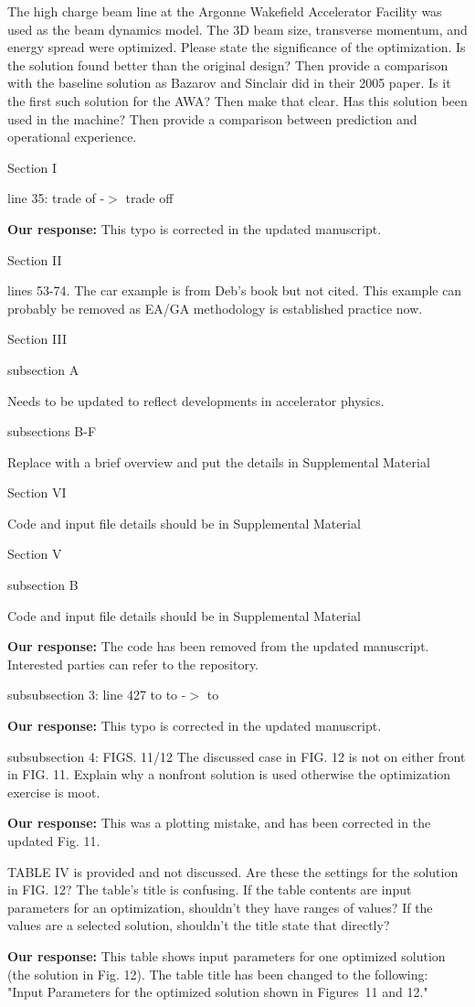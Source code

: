 \documentclass{article}
\begin{document}
The high charge beam line at the Argonne Wakefield Accelerator
Facility was used as the beam dynamics model. The 3D beam size,
transverse momentum, and energy spread were optimized. Please state
the significance of the optimization. Is the solution found better
than the original design? Then provide a comparison with the baseline
solution as Bazarov and Sinclair did in their 2005 paper. Is it the
first such solution for the AWA? Then make that clear. Has this
solution been used in the machine? Then provide a comparison between
prediction and operational experience.

Section I

line 35: trade of -$>$ trade off

{\bf Our response:} {\color{blue} This typo is corrected in the updated manuscript.}

Section II

lines 53-74. The car example is from Deb’s book but not cited. This
example can probably be removed as EA/GA methodology is established
practice now.

Section III

subsection A

Needs to be updated to reflect developments in accelerator physics.

subsections B-F

Replace with a brief overview and put the details in Supplemental
Material

Section VI

Code and input file details should be in Supplemental Material

Section V

subsection B

Code and input file details should be in Supplemental Material

{\bf Our response:} {\color{blue} The code has been removed from the updated manuscript. Interested parties can refer to the repository.}

subsubsection 3:
line 427 to to -$>$ to

{\bf Our response:} {\color{blue} This typo is corrected in the updated manuscript.}

subsubsection 4:
FIGS. 11/12 The discussed case in FIG. 12 is not on either front in
FIG. 11. Explain why a nonfront solution is used otherwise the
optimization exercise is moot.

{\bf Our response:} {\color{blue} This was a plotting mistake, and has been corrected in the updated Fig. 11.}

TABLE IV is provided and not discussed. Are these the settings for the
solution in FIG. 12? The table’s title is confusing. If the table
contents are input parameters for an optimization, shouldn’t they have
ranges of values? If the values are a selected solution, shouldn’t the
title state that directly?

{\bf Our response:} {\color{blue} This table shows input parameters for one optimized solution (the solution in Fig. 12). 
The table title has been changed to the following: "Input Parameters for the optimized solution shown in Figures~11 and 12."}


 
\end{document}

